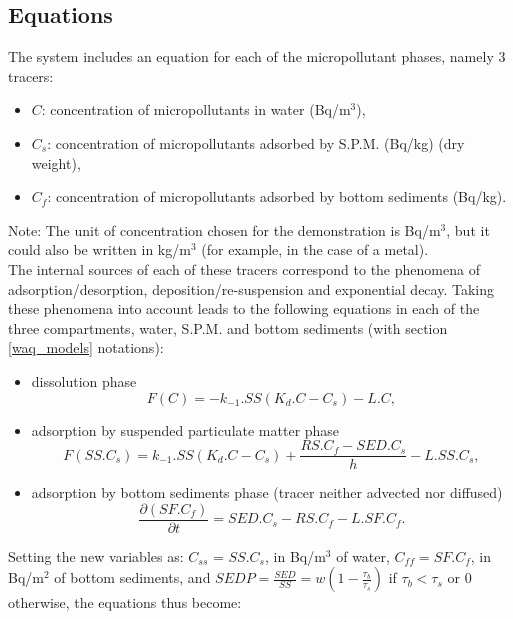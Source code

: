 \subsection{Equations}

The system includes an equation for each of the micropollutant phases, namely 3 tracers:

\begin{itemize}
\item $C$: concentration of micropollutants in water (Bq/m$^3$),
\item $C_s$: concentration of micropollutants adsorbed by S.P.M. (Bq/kg) (dry weight),
\item $C_f$: concentration of micropollutants adsorbed by bottom sediments (Bq/kg).
\end{itemize}

Note: The unit of concentration chosen for the demonstration is Bq/m$^3$,
but it could also be written in kg/m$^3$ (for example, in the case of a metal).\\

The internal sources of each of these tracers correspond to the phenomena
of adsorption/desorption, deposition/re-suspension and exponential decay.
Taking these phenomena into account leads to the following equations
in each of the three compartments, water, S.P.M. and bottom sediments
(with section \ref{waq_models} notations):

\begin{itemize}
\item dissolution phase
\begin{equation}
  F(C) = -k_{-1}.SS (K_d.C - C_s ) - L.C,
\end{equation}

\item adsorption by suspended particulate matter phase
\begin{equation}
  F(SS.C_s) = k_{-1}.SS (K_d.C - C_s ) + \frac{RS.C_f-SED.C_s}{h} - L.SS.C_s,
\end{equation}

\item adsorption by bottom sediments phase (tracer neither advected nor diffused)
\begin{equation}
  \frac{\partial (SF.C_f)}{\partial t} = SED.C_s - RS.C_f - L.SF.C_f.
\end{equation}

\end{itemize}

Setting the new variables as: $C_{ss}$  = $SS.C_s$, in Bq/m$^3$ of water,
$C_{ff} = SF.C_f$, in Bq/m$^2$ of bottom sediments,
and $SEDP = \frac{SED}{SS} = w \left (1-\frac{\tau_b}{\tau_s} \right)$
if $\tau_b < \tau_s$ or 0 otherwise, the equations thus become:\\

